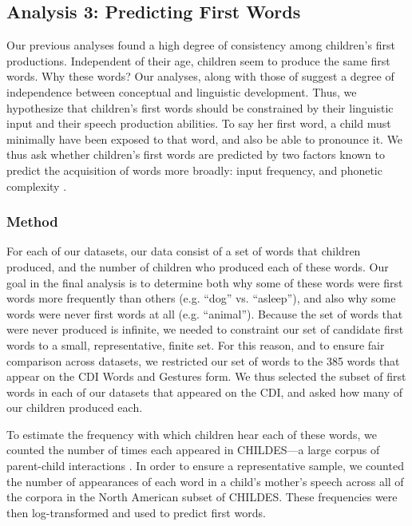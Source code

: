 \documentclass[10pt,letterpaper]{article}
\begin{document}
\subsection{Analysis 3: Predicting First Words}

Our previous analyses found a high degree of consistency among children's first productions. Independent of their age, children seem to produce the same first words. Why these words? Our analyses, along with those of  suggest a degree of independence between conceptual and linguistic development. Thus, we hypothesize that children's first words should be constrained by their linguistic input and their speech production abilities. To say her first word, a child must minimally have been exposed to that word, and also be able to pronounce it. We thus ask whether children's first words are predicted by two factors known to predict the acquisition of words more broadly: input frequency, and phonetic complexity \cite{morgan1996,goodman2008}.

\subsubsection{Method}

For each of our datasets, our data consist of a set of words that children produced, and the number of children who produced each of these words. Our goal in the final analysis is to determine both why some of these words were first words more frequently than others (e.g. ``dog'' vs. ``asleep''), and also why some words were never first words at all (e.g. ``animal''). Because the set of words that were never produced is infinite, we needed to constraint our set of candidate first words to a small, representative, finite set. For this reason, and to ensure fair comparison across datasets, we restricted our set of words to the 385 words that appear on the CDI Words and Gestures form. We thus selected the subset of first words in each of our datasets that appeared on the CDI, and asked how many of our children produced each.

To estimate the frequency with which children hear each of these words, we counted the number of times each appeared in CHILDES---a large corpus of parent-child interactions \cite{macwhinney2000}. In order to ensure a representative sample, we counted the number of appearances of each word in a child's mother's speech across all of the corpora in the North American subset of CHILDES. These frequencies were then log-transformed and used to predict first words.
\end{document}
